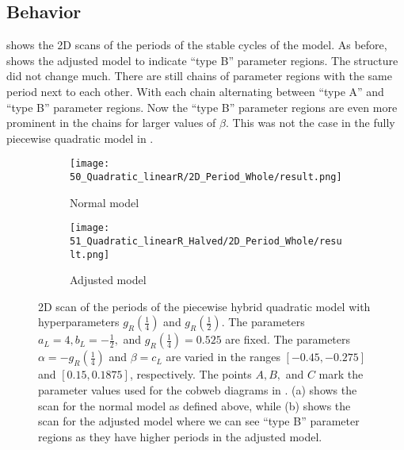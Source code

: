 \subsection{Behavior}
\label{sec:setup.quad.hybrid.behavior}

 shows the 2D scans of the periods of the stable cycles of the model.
As before,  shows the adjusted model to indicate ``type B'' parameter regions.
The structure did not change much.
There are still chains of parameter regions with the same period next to each other.
With each chain alternating between ``type A'' and ``type B'' parameter regions.
Now the ``type B'' parameter regions are even more prominent in the chains for larger values of $\beta$.
This was not the case in the fully piecewise quadratic model in .

\begin{figure}
	\centering
	\begin{subfigure}{0.4\textwidth}
		\centering
		\texttt{[image: 50\_Quadratic\_linearR/2D\_Period\_Whole/result.png]}
		\caption{Normal model}
		\label{fig:setup.quad.hybrid.period.full}
	\end{subfigure}
	\begin{subfigure}{0.4\textwidth}
		\centering
		\texttt{[image: 51\_Quadratic\_linearR\_Halved/2D\_Period\_Whole/result.png]}
		\caption{Adjusted model}
		\label{fig:setup.quad.hybrid.period.halved}
	\end{subfigure}
	\caption[2D scan of the periods of the piecewise hybrid quadratic model with hyperparameters]{
		2D scan of the periods of the piecewise hybrid quadratic model with hyperparameters $g_R\left(\frac{1}{4}\right)$ and $g_R\left(\frac{1}{2}\right)$.
		The parameters $a_L = 4, b_L = -\frac{1}{2},$ and $g_R\left(\frac{1}{4}\right) = 0.525$ are fixed.
		The parameters $\alpha = -g_R\left(\frac{1}{4}\right)$ and $\beta = c_L$ are varied in the ranges $[-0.45, -0.275]$ and $[0.15, 0.1875]$, respectively.
		The points $A, B,$ and $C$ mark the parameter values used for the cobweb diagrams in .
		(a) shows the scan for the normal model as defined above, while (b) shows the scan for the adjusted model where we can see ``type B'' parameter regions as they have higher periods in the adjusted model.
	}
	\label{fig:setup.quad.hybrid.period}
\end{figure}

